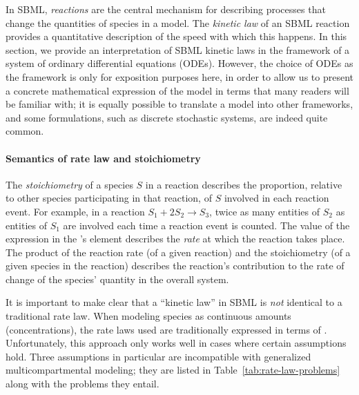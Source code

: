 In SBML, \emph{reactions} are the central mechanism for describing
processes that change the quantities of species in a model.  The
\emph{kinetic law} of an SBML reaction provides a quantitative
description of the speed with which this happens.  In this
section, we provide an interpretation of SBML kinetic laws in the
framework of a system of ordinary differential equations (ODEs).
However, the choice of ODEs as the framework is only for
exposition purposes here, in order to allow us to present a
concrete mathematical expression of the model in terms that many
readers will be familiar with; it is equally possible to translate
a model into other frameworks, and some formulations, such as
discrete stochastic systems, are indeed quite common.


\paragraph{Semantics of rate law and stoichiometry}

The \emph{stoichiometry} of a species $S$ in a reaction describes
the proportion, relative to other species participating in that
reaction, of $S$ involved in each reaction event.  For example, in
a reaction $S_1 + 2 S_2 \rightarrow S_3$, twice as many entities
of $S_2$ as entities of $S_1$ are involved each time a reaction
event is counted.  The value of the expression in the
\KineticLaw's  element describes the \emph{rate} at
which the reaction takes place.  The product of the reaction rate
(of a given reaction) and the stoichiometry (of a given species in
the reaction) describes the reaction's contribution to the rate of
change of the species' quantity in the overall system.

It is important to make clear that a ``kinetic law'' in SBML is
\emph{not} identical to a traditional rate law.  When modeling
species as continuous amounts (\eg concentrations), the rate laws
used are traditionally expressed in terms of
.  Unfortunately, this approach
only works well in cases where certain assumptions hold.  Three
assumptions in particular are incompatible with generalized
multicompartmental modeling; they are listed in
Table~\ref{tab:rate-law-problems} along with the problems they
entail.

